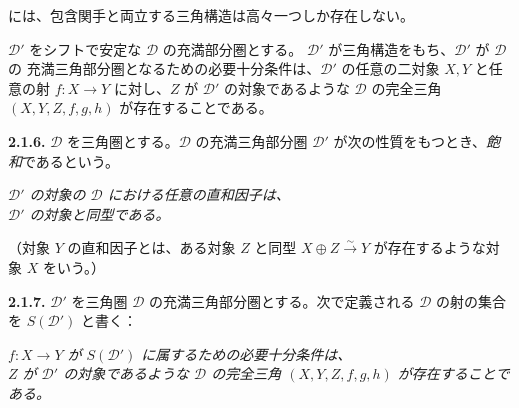 \clearpage
{}%
\begingroup
\small
\setlength{\emergencystretch}{1.5em}%
\setlength{\abovedisplayskip}{2pt plus 1pt minus 1pt}%
\setlength{\belowdisplayskip}{2pt plus 1pt minus 1pt}%

\noindent には、包含関手と両立する三角構造は高々一つしか存在しない。

$\mathcal D'$ をシフトで安定な $\mathcal D$ の充満部分圏とする。
$\mathcal D'$ が三角構造をもち、$\mathcal D'$ が $\mathcal D$ の
充満三角部分圏となるための必要十分条件は、$\mathcal D'$ の任意の二対象
$X,Y$ と任意の射
$f\colon X\to Y$ に対し、$Z$ が $\mathcal D'$ の対象であるような
$\mathcal D$ の完全三角 $(X,Y,Z,f,g,h)$ が存在することである。

\medskip
\noindent\textbf{2.1.6.}\quad
{}
$\mathcal D$ を三角圏とする。$\mathcal D$ の充満三角部分圏 $\mathcal D'$
が次の性質をもつとき、\emph{飽和}であるという。

\par\smallskip
\noindent{}%
\begin{minipage}[t]{\linewidth}
  \centering\itshape
  $\mathcal D'$ の対象の $\mathcal D$ における任意の直和因子は、\\[-1pt]
  $\mathcal D'$ の対象と同型である。
\end{minipage}
\par\smallskip

\noindent （対象 $Y$ の直和因子とは、ある対象 $Z$ と同型
$X\oplus Z\xrightarrow{\sim}Y$ が存在するような対象 $X$ をいう。）

\medskip
\noindent\textbf{2.1.7.}\quad
{}
$\mathcal D'$ を三角圏 $\mathcal D$ の充満三角部分圏とする。次で定義される
$\mathcal D$ の射の集合を $S(\mathcal D')$ と書く：

\par\smallskip
\noindent{}%
\begin{minipage}[t]{\linewidth}
  \centering\itshape
  $f\colon X\to Y$ が $S(\mathcal D')$ に属するための必要十分条件は、\\[-1pt]
  $Z$ が $\mathcal D'$ の対象であるような $\mathcal D$ の完全三角
  $(X,Y,Z,f,g,h)$ が存在することである。
\end{minipage}
\par\smallskip

